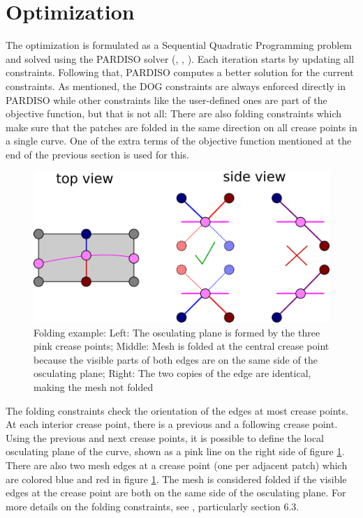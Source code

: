 \documentclass[a4paper,twoside,12pt,nochapterprefix]{scrbook}
\begin{document}
\section{Optimization}\label{sec:optimization}
The optimization is formulated as a Sequential Quadratic Programming problem and solved using the PARDISO solver (\cite{pardiso-6.0a}, \cite{pardiso-6.0b}, \cite{pardiso-6.0c}). Each iteration starts by updating all constraints. Following that, PARDISO computes a better solution for the current constraints. As mentioned, the DOG constraints are always enforced directly in PARDISO while other constraints like the user-defined ones are part of the objective function, but that is not all:\newline
There are also folding constraints which make sure that the patches are folded in the same direction on all crease points in a single curve. One of the extra terms of the objective function mentioned at the end of the previous section is used for this.\newline
\begin{figure}
    \centering
    \includegraphics[width=0.4\linewidth]{figures/0322_folding_constraints}
    \caption{Folding example: Left: The osculating plane is formed by the three pink crease points; Middle: Mesh is folded at the central crease point because the visible parts of both edges are on the same side of the osculating plane; Right: The two copies of the edge are identical, making the mesh not folded}
    \label{fig:folding_constraints}
\end{figure}
The folding constraints check the orientation of the edges at most crease points. At each interior crease point, there is a previous and a following crease point. Using the previous and next crease points, it is possible to define the local osculating plane of the curve, shown as a pink line on the right side of figure \ref{fig:folding_constraints}. There are also two mesh edges at a crease point (one per adjacent patch) which are colored blue and red in figure \ref{fig:folding_constraints}. The mesh is considered folded if the visible edges at the crease point are both on the same side of the osculating plane. For more details on the folding constraints, see \cite{Rabinovich:CurvedFolds:2019}, particularly section 6.3.\newline
\end{document}
